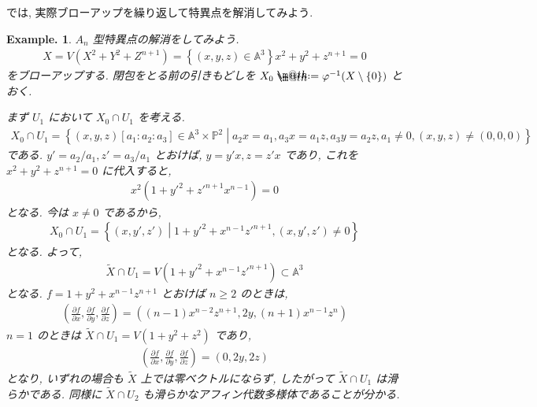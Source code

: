 \documentclass[openany, a4paper, oneside]{jsbook}
\makeatletter
\newcommand*{\defeq}{\mathrel{\rlap{%
\raisebox{0.3ex}{$\m@th\cdot$}}%
\raisebox{-0.3ex}{$\m@th\cdot$}}%
=}
\theoremstyle{break}
\theoremstyle{breakdefn}
\newtheorem{ex}[thm]{Example.}
\newcommand{\rbk}[1]{\left (#1\right)}
\newcommand{\cbk}[1]{\left\{#1\right\}}
\newcommand{\relmiddle}[1]{\mathrel{}\middle#1\mathrel{}}
\newcommand{\set}[2]{\left\{#1 \relmiddle| #2\right\}}
\makeatother
\begin{document}
では, 実際ブローアップを繰り返して特異点を解消してみよう.
\begin{ex}
$A_n$ 型特異点の解消をしてみよう.
\begin{align}
 X
 =
 V (X^2+Y^2+Z^{n+1})
 =
 \cbk{ (x,y,z) \in \mathbb{A}^3}{x^2+y^2+z^{n+1}=0}
\end{align}
をブローアップする.
閉包をとる前の引きもどしを $X_0 \defeq \varphi^{-1}(X \setminus \{0\})$ とおく.

まず $U_1$ において $X_0 \cap U_1$ を考える.
\begin{align}
 X_0 \cap U_1
 =
 \set{ (x,y,z) [a_1:a_2:a_3] \in \mathbb{A}^3 \times \mathbb{P}^2}{a_2x=a_1, a_3x=a_1z, a_3y=a_2z, a_1 \neq 0, (x,y,z) \neq (0,0,0)}
\end{align}
である.
$y'=a_2/a_1, z'=a_3/a_1$ とおけば, $y=y'x, z=z'x$ であり, これを $x^2+y^2+z^{n+1}=0$ に代入すると,
\begin{align}
 x^2 (1+ y'^2+z'^{n+1}x^{n-1})
 =
 0
\end{align}
となる.
今は $x \neq 0$ であるから,
\begin{align}
 X_0 \cap U_1
 =
 \set{(x,y',z')}{1+y'^2+x^{n-1}z'^{n+1}, (x,y',z') \neq 0}
\end{align}
となる.
よって,
\begin{align}
 \widetilde{X} \cap U_1
 =
 V (1+y'^2+x^{n-1}z'^{n+1}) \subset \mathbb{A}^3
\end{align}
となる.
$f=1+y^2+x^{n-1}z^{n+1}$ とおけば $n \geq 2$ のときは,
\begin{align}
 \rbk{\frac{\partial f}{\partial x}, \frac{\partial f}{\partial y}, \frac{\partial f}{\partial z}}
 =
 \rbk{(n-1) x^{n-2}z^{n+1}, 2y, (n+1) x^{n-1}z^n}
\end{align}
$n=1$ のときは $\widetilde{X} \cap U_1 = V (1+y^2+z^2)$ であり,
\begin{align}
 \rbk{\frac{\partial f}{\partial x}, \frac{\partial f}{\partial y}, \frac{\partial f}{\partial z}}
 =
 \rbk{0, 2y, 2z}
\end{align}
となり, いずれの場合も $\widetilde{X}$ 上では零ベクトルにならず,
したがって $\widetilde{X} \cap U_1$ は滑らかである.
同様に $\widetilde{X} \cap U_2$ も滑らかなアフィン代数多様体であることが分かる.


\end{ex}
\end{document}
